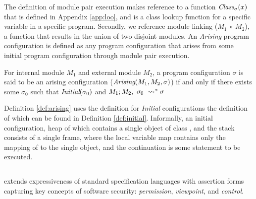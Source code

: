 The definition of module pair execution makes reference to a function
$\textit{Class}_{\sigma}(x)$ that is defined in Appendix \ref{app:loo}, and
is a class lookup function for a specific variable in a specific program.
Secondly, we reference module linking ($M_1\ \circ\ M_2$), a function
that results in the union of two disjoint modules.
An \emph{Arising} program configuration is defined as any program configuration
that arises from some initial program configuration through module pair execution.
\begin{definition}
\label{def:arising}
For internal module $M_1$ and external module $M_2$, a program configuration $\sigma$ is 
said to be an arising configuration ($\textit{Arising}(M_1, M_2, \sigma)$)
if and only if there exists some $\sigma_0$ such that $\textit{Initial}(\sigma_0)$ and
$M_1 ; M_2,\ \sigma_0\ \leadsto^* \sigma$
\end{definition}
Definition \ref{def:arising} uses the definition for \emph{Initial} configurations 
the definition of which can be found in Definition \ref{def:initial}. Informally, 
an initial configuration, heap of which contains a single object of class , and
the stack consists of a single frame, where the local variable map contains only the 
mapping of  to the single object, and the continuation is some statement
to be executed.



\subsection{\Chainmail}
\Chainmail extends expressiveness of standard specification languages
with assertion forms capturing key concepts of software security:
 \emph{permission}, \emph{viewpoint}, and \emph{control}.

